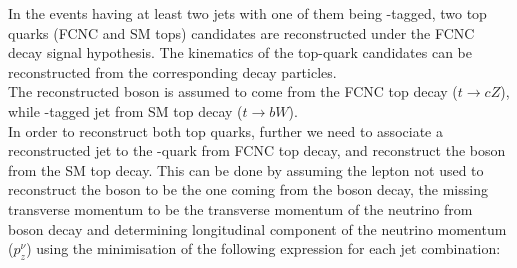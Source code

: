 \label{sec:sel:topmassrec}
In the events having at least two jets with one of them being \Pqb-tagged, two top quarks (FCNC and SM tops) candidates are reconstructed under the FCNC \ttbar decay signal hypothesis.
The kinematics of the top-quark candidates can be reconstructed from
the corresponding decay particles.\\
The reconstructed \PZ boson is assumed to come from the FCNC top decay ($t\to cZ$),
while \Pqb-tagged jet from SM top decay ($t\to bW$).\\
In order to reconstruct both top quarks, 
further we need to associate a reconstructed jet to the \Pqc-quark from FCNC top decay, and reconstruct
the \PW boson from the SM top decay. This can be done by assuming the lepton not used to reconstruct the \PZ boson to be the one coming from the \PW boson decay,
the missing transverse momentum to be the transverse momentum of the neutrino from \PW boson decay
and determining longitudinal component of the neutrino momentum ($p^{\nu}_z$)
using the minimisation of the following expression for each jet combination:

